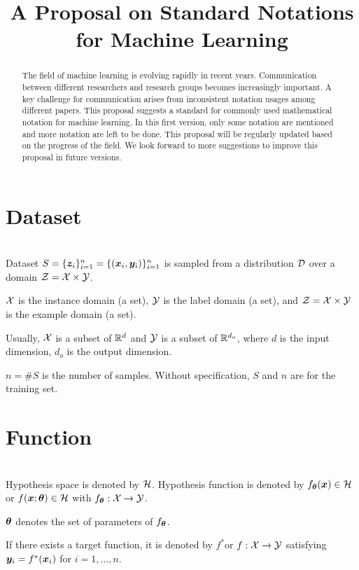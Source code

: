 \documentclass[]{article}
\begin{document}
\title{A Proposal on Standard Notations for Machine Learning}
\author{}

\maketitle 
\begin{abstract}
The field of machine learning is evolving rapidly in recent years. Communication between different researchers and research groups becomes increasingly important. A key challenge for communication arises from inconsistent notation usages among different papers. This proposal suggests a standard for commonly used mathematical notation for machine learning. In this first version, only some notation are mentioned and more notation are left to be done. This proposal will be regularly updated based on the progress of the field. We look forward to more suggestions to improve this proposal in future versions.
\end{abstract}

\tableofcontents

\section{Dataset}~\\
Dataset  $S=\{\bm{z}_i\}_{i=1}^n=\{(\bm{x}_i,\bm{y}_i)\}_{i=1}^n$ is sampled from a distribution $\mathcal{D}$ over a domain $\mathcal{Z}=\mathcal{X}\times\mathcal{Y}$. 

$\mathcal{X}$  is the instance domain (a set), $\mathcal{Y}$ is the label domain (a set), and $\mathcal{Z}=\mathcal{X}\times\mathcal{Y}$ is the example domain (a set). 

Usually, 
$\mathcal{X}$ is a subset of $\mathbb{R}^d$ and $\mathcal{Y}$ is a subset of $\mathbb{R}^{d_{o}}$, where $d$ is the input dimension, $d_{o}$ is the output dimension.

$n=\#S$ is the number of samples. Without specification, $S$ and $n$ are for the training set.

\section{Function}~\\
Hypothesis space is denoted by $\mathcal{H}$. Hypothesis function is denoted by $f_{\bm{\theta}}(\bm{x})\in\mathcal{H}$ or $f(\bm{x};\bm{\theta})\in\mathcal{H}$ with $f_{\bm{\theta}}:\mathcal{X}\to\mathcal{Y}$.

$\bm{\theta}$  denotes the set of parameters of  $f_{\bm{\theta}}$.  

If there exists a target function, it is denoted by $f^*$or $f:\mathcal{X}\to\mathcal{Y}$ satisfying $\bm{y}_i=f^*(\bm{x}_i)$ for $i=1,\ldots,n$.
\end{document}
